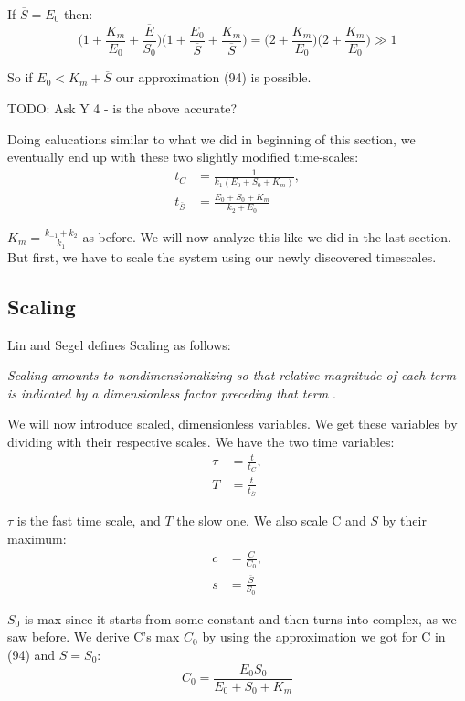 \documentclass[12pt]{article}
\begin{document}
If $\overline{S} = E_0$ then:
\begin{equation}
\Big(1 + \frac{K_m}{E_0} + \frac{\overline{E}}{S_0}\Big)\Big(1 + \frac{E_0}{\overline{S}} + \frac{K_m}{\overline{S}}\Big) = \Big(2 + \frac{K_m}{E_0}\Big) \Big(2 + \frac{K_m}{E_0}\Big) \gg 1
\end{equation}

So if $E_0 < K_m + \overline{S}$ our approximation (94) is possible.

TODO: Ask Y 4 - is the above accurate?

Doing calucations similar to what we did in beginning of this section,
we eventually end up with these two slightly modified time-scales:
\begin{align}
t_C &= \frac{1}{k_1(E_0+S_0+K_m)}, \\
t_{\overline{S}} &= \frac{E_0+S_0+K_m}{k_2+E_0}
\end{align}

$K_m = \frac{k_{-1}+k_2}{k_1}$ as before. We will now analyze this
like we did in the last section. But first, we have to scale the
system using our newly discovered timescales.

\subsection{Scaling}

Lin and Segel defines Scaling as follows:

\textit{Scaling amounts to nondimensionalizing so that relative magnitude of
each term is indicated by a dimensionless factor preceding that term}
\cite{lin1974mathematics}.

We will now introduce scaled, dimensionless variables. We get these variables by
dividing with their respective scales. We have the two time variables:
\begin{align}
\tau &= \frac{t}{t_C}, \\
T &= \frac{t}{t_{\overline{S}}}
\end{align}

$\tau$ is the fast time scale, and $T$ the slow one. We also scale C and
$\overline{S}$ by their maximum:
\begin{align}
c &= \frac{C}{C_0}, \\
s &= \frac{\overline{S}}{S_0}
\end{align}

$S_0$ is max since it starts from some constant and then turns into
complex, as we saw before. We derive C's max $C_0$ by using the
approximation we got for C in (94) and $S=S_0$:
\begin{equation}
C_0 = \frac{E_0 S_0}{E_0 + S_0 + K_m}
\end{equation}
\end{document}
